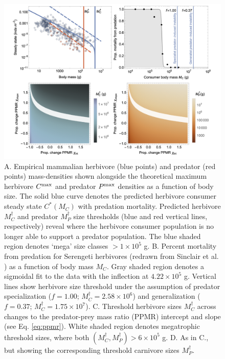 \documentclass[]{rsos}%
\begin{document}
\begin{figure}
  \centering
  \includegraphics[width=1\textwidth]{fig_predation_alltogether.png}
  \caption{
	  A. Empirical mammalian herbivore (blue points) and predator (red points) mass-densities shown alongside the theoretical maximum herbivore $C^{\rm max}$ and predator $P^{\rm max}$ densities as a function of body size. 
	  The solid blue curve denotes the predicted herbivore consumer steady state $C^*(M_C)$ with predation mortality.
	  Predicted herbivore $M_C^\dagger$ and predator $M_P^\dagger$ size thresholds (blue and red vertical lines, respectively) reveal where the herbivore consumer population is no longer able to support a predator population. 
	  The blue shaded region denotes `mega' size classes $>1\times10^5$ g.
	  B. Percent mortality from predation for Serengeti herbivores (redrawn from Sinclair et al. \citep{Sinclair2003}) as a function of body mass $M_C$. Gray shaded region denotes a sigmoidal fit to the data with the inflection at $4.22\times10^5$ g. Vertical lines show herbivore size threshold under the assumption of predator specialization ($f=1.00$; $M_C^\dagger=2.58\times10^6$) and generalization ($f=0.37$; $M_C^\dagger=1.75\times10^7$).
	  C. Threshold herbivore sizes $M_C^\dagger$ across changes to the predator-prey mass ratio (PPMR) intercept and slope (see Eq. \ref{eq:ppmr}).
	  White shaded region denotes megatrophic threshold sizes, where both $(M_C^\dagger,M_P^\dagger) > 6\times10^5$ g. 
	  D. As in C., but showing the corresponding threshold carnivore sizes $M_P^\dagger$.
  }
  \label{fig:predrate}
\end{figure}
\end{document}
